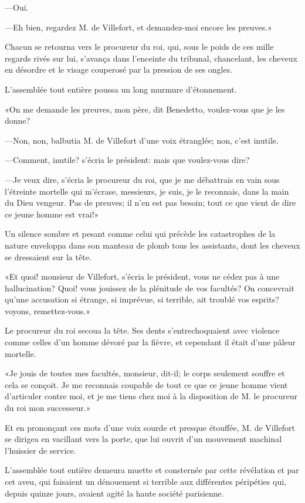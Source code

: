 —Oui. 

—Eh bien, regardez M. de Villefort, et demandez-moi encore les preuves.» 

Chacun se retourna vers le procureur du roi, qui, sous le poids de ces mille regards rivés sur lui, s'avança dans l'enceinte du tribunal, chancelant, les cheveux en désordre et le visage couperosé par la pression de ses ongles. 

L'assemblée tout entière poussa un long murmure d'étonnement. 

«On me demande les preuves, mon père, dit Benedetto, voulez-vous que je les donne? 

—Non, non, balbutia M. de Villefort d'une voix étranglée; non, c'est inutile. 

—Comment, inutile? s'écria le président: mais que voulez-vous dire? 

—Je veux dire, s'écria le procureur du roi, que je me débattrais en vain sous l'étreinte mortelle qui m'écrase, messieurs, je suis, je le reconnais, dans la main du Dieu vengeur. Pas de preuves; il n'en est pas besoin; tout ce que vient de dire ce jeune homme est vrai!» 

Un silence sombre et pesant comme celui qui précède les catastrophes de la nature enveloppa dans son manteau de plomb tous les assistants, dont les cheveux se dressaient sur la tête. 

«Et quoi! monsieur de Villefort, s'écria le président, vous ne cédez pas à une hallucination? Quoi! vous jouissez de la plénitude de vos facultés? On concevrait qu'une accusation si étrange, si imprévue, si terrible, ait troublé vos esprits? voyons, remettez-vous.» 

Le procureur du roi secoua la tête. Ses dents s'entrechoquaient avec violence comme celles d'un homme dévoré par la fièvre, et cependant il était d'une pâleur mortelle. 

«Je jouis de toutes mes facultés, monsieur, dit-il; le corps seulement souffre et cela se conçoit. Je me reconnais coupable de tout ce que ce jeune homme vient d'articuler contre moi, et je me tiens chez moi à la disposition de M. le procureur du roi mon successeur.» 

Et en prononçant ces mots d'une voix sourde et presque étouffée, M. de Villefort se dirigea en vacillant vers la porte, que lui ouvrit d'un mouvement machinal l'huissier de service. 

L'assemblée tout entière demeura muette et consternée par cette révélation et par cet aveu, qui faisaient un dénouement si terrible aux différentes péripéties qui, depuis quinze jours, avaient agité la haute société parisienne. 

